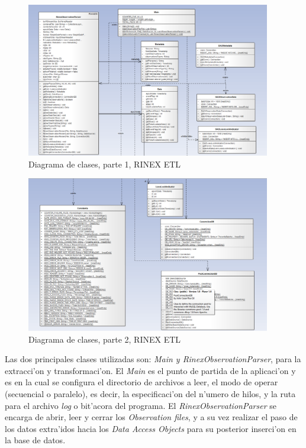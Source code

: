 \begin{enumerate}
\begin{figure}[H]
\centering
\includegraphics[width=0.95\textwidth]{images/Class_Diagram_1}
\caption{Diagrama de clases, parte 1, RINEX ETL}
\label{fig:4.8}
\end{figure}

\begin{figure}[H]
\centering
\includegraphics[width=0.95\textwidth]{images/Class_Diagram_2}
\caption{Diagrama de clases, parte 2, RINEX ETL}
\label{fig:4.9}
\end{figure}

Las dos principales clases utilizadas son: \emph{Main y RinexObservationParser}, para la extracci'on y transformaci'on. El \emph{Main} es el punto de partida de la aplicaci'on y es en la cual se configura el directorio de archivos a leer, el modo de operar (secuencial o paralelo), es decir, la especificaci'on del n'umero de hilos, y la ruta para el archivo \emph{log} o bit'acora del programa. El \emph{RinexObservationParser} se encarga de abrir, leer y cerrar los \emph{Observation files}, y a su vez realizar el paso de los datos extra'idos hacia los \emph{Data Access Objects} para su posterior inserci'on en la base de datos. \\


\end{enumerate}
